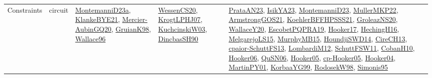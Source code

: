 {\begin{longtable}{lp{3cm}>{\raggedright}p{6cm}>{\raggedright}p{6cm}p{8cm}}
Constraints & circuit & \href{articles/MontemanniD23a.pdf}{MontemanniD23a}\cite{MontemanniD23a}, \href{papers/KlankeBYE21.pdf}{KlankeBYE21}\cite{KlankeBYE21}, \href{papers/Mercier-AubinGQ20.pdf}{Mercier-AubinGQ20}\cite{Mercier-AubinGQ20}, \href{papers/GruianK98.pdf}{GruianK98}\cite{GruianK98}, \href{articles/Wallace96.pdf}{Wallace96}\cite{Wallace96} & \href{papers/WessenCS20.pdf}{WessenCS20}\cite{WessenCS20}, \href{papers/KrogtLPHJ07.pdf}{KrogtLPHJ07}\cite{KrogtLPHJ07}, \href{articles/KuchcinskiW03.pdf}{KuchcinskiW03}\cite{KuchcinskiW03}, \href{articles/DincbasSH90.pdf}{DincbasSH90}\cite{DincbasSH90} & \href{articles/PrataAN23.pdf}{PrataAN23}\cite{PrataAN23}, \href{articles/IsikYA23.pdf}{IsikYA23}\cite{IsikYA23}, \href{articles/MontemanniD23.pdf}{MontemanniD23}\cite{MontemanniD23}, \href{articles/MullerMKP22.pdf}{MullerMKP22}\cite{MullerMKP22}, \href{papers/ArmstrongGOS21.pdf}{ArmstrongGOS21}\cite{ArmstrongGOS21}, \href{articles/KoehlerBFFHPSSS21.pdf}{KoehlerBFFHPSSS21}\cite{KoehlerBFFHPSSS21}, \href{papers/GroleazNS20.pdf}{GroleazNS20}\cite{GroleazNS20}, \href{articles/WallaceY20.pdf}{WallaceY20}\cite{WallaceY20}, \href{articles/EscobetPQPRA19.pdf}{EscobetPQPRA19}\cite{EscobetPQPRA19}, \href{papers/Hooker17.pdf}{Hooker17}\cite{Hooker17}, \href{papers/HechingH16.pdf}{HechingH16}\cite{HechingH16}, \href{papers/MelgarejoLS15.pdf}{MelgarejoLS15}\cite{MelgarejoLS15}, \href{papers/MurphyMB15.pdf}{MurphyMB15}\cite{MurphyMB15}, \href{papers/HoundjiSWD14.pdf}{HoundjiSWD14}\cite{HoundjiSWD14}, \href{papers/CireCH13.pdf}{CireCH13}\cite{CireCH13}, \href{papers/cpaior-SchuttFS13.pdf}{cpaior-SchuttFS13}\cite{cpaior-SchuttFS13}, \href{articles/LombardiM12.pdf}{LombardiM12}\cite{LombardiM12}, \href{articles/SchuttFSW11.pdf}{SchuttFSW11}\cite{SchuttFSW11}, \href{papers/CobanH10.pdf}{CobanH10}\cite{CobanH10}, \href{articles/Hooker06.pdf}{Hooker06}\cite{Hooker06}, \href{papers/QuSN06.pdf}{QuSN06}\cite{QuSN06}, \href{articles/Hooker05.pdf}{Hooker05}\cite{Hooker05}, \href{papers/cp-Hooker05.pdf}{cp-Hooker05}\cite{cp-Hooker05}, \href{papers/Hooker04.pdf}{Hooker04}\cite{Hooker04}, \href{articles/MartinPY01.pdf}{MartinPY01}\cite{MartinPY01}, \href{papers/KorbaaYG99.pdf}{KorbaaYG99}\cite{KorbaaYG99}, \href{papers/RodosekW98.pdf}{RodosekW98}\cite{RodosekW98}, \href{papers/Simonis95.pdf}{Simonis95}\cite{Simonis95}\\

\end{longtable}}
